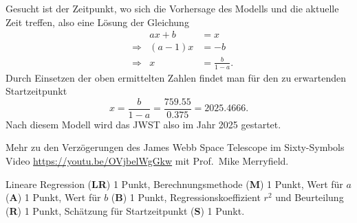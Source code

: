 \begin{loesung}
\begin{teilaufgaben}
\item
Gesucht ist der Zeitpunkt, wo sich die Vorhersage des Modells und die
aktuelle Zeit treffen, also eine Lösung der Gleichung
\[
\begin{aligned}
&&ax+b&=x
\\
&\Rightarrow&(a-1)x&=-b
\\
&\Rightarrow& x&=\frac{b}{1-a}.
\end{aligned}
\]
Durch Einsetzen der oben ermittelten Zahlen findet man für den zu
erwartenden Startzeitpunkt
\[
x
=
\frac{b}{1-a}
=
\frac{759.55}{0.375}
=
2025.4666.
\]
Nach diesem Modell wird das JWST also im Jahr 2025 gestartet.
\qedhere
\end{teilaufgaben}
\end{loesung}

\begin{diskussion}Mehr zu den Verzögerungen des
James Webb Space Telescope im Sixty-Symbols Video
\url{https://youtu.be/OVjbelWgGkw} mit Prof.~Mike Merryfield.
\end{diskussion}

\begin{bewertung}
Lineare Regression ({\bf LR}) 1 Punkt,
Berechnungsmethode ({\bf M}) 1 Punkt,
Wert für $a$ ({\bf A}) 1 Punkt,
Wert für $b$ ({\bf B}) 1 Punkt,
Regressionskoeffizient $r^2$ und Beurteilung ({\bf R}) 1 Punkt,
Schätzung für Startzeitpunkt ({\bf S}) 1 Punkt.
\end{bewertung}

%
%
%
%
%
%
%
%
%
%
%
%
